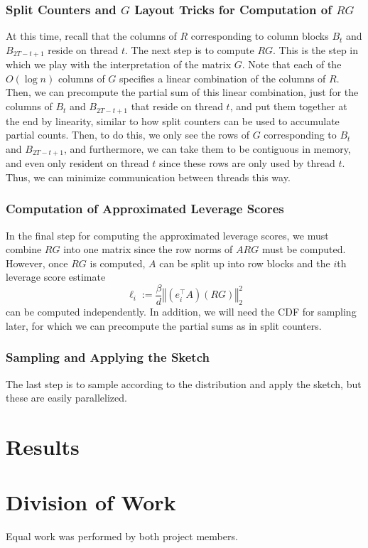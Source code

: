 \documentclass[12pt]{article}
\providecommand{\norm}[1]{\left\Vert#1\right\Vert}
\begin{document}
\subsubsection{Split Counters and $G$ Layout Tricks for Computation of $RG$}
At this time, recall that the columns of $R$ corresponding to column blocks $B_t$ and $B_{2T-t+1}$ reside on thread $t$. The next step is to compute $RG$. This is the step in which we play with the interpretation of the matrix $G$. Note that each of the $O(\log n)$ columns of $G$ specifies a linear combination of the columns of $R$. Then, we can precompute the partial sum of this linear combination, just for the columns of $B_t$ and $B_{2T-t+1}$ that reside on thread $t$, and put them together at the end by linearity, similar to how split counters can be used to accumulate partial counts. Then, to do this, we only see the rows of $G$ corresponding to $B_t$ and $B_{2T-t+1}$, and furthermore, we can take them to be contiguous in memory, and even only resident on thread $t$ since these rows are only used by thread $t$. Thus, we can minimize communication between threads this way.

\subsubsection{Computation of Approximated Leverage Scores}
In the final step for computing the approximated leverage scores, we must combine $RG$ into one matrix since the row norms of $ARG$ must be computed. However, once $RG$ is computed, $A$ can be split up into row blocks and the $i$th leverage score estimate
\[
	\ell_i := \frac{\beta}{d}\norm{(e_i^\top A)(RG)}_2^2
\]
can be computed independently. In addition, we will need the CDF for sampling later, for which we can precompute the partial sums as in split counters. 

\subsubsection{Sampling and Applying the Sketch}
The last step is to sample according to the distribution and apply the sketch, but these are easily parallelized.

\section{Results}

\section{Division of Work}
Equal work was performed by both project members. 



\end{document}
